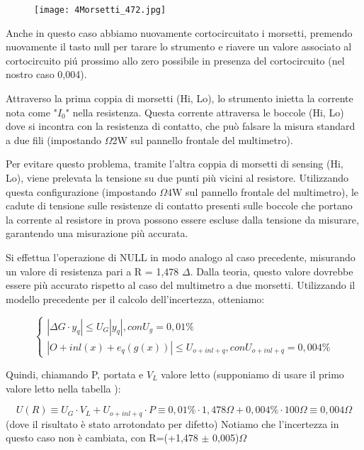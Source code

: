 \begin{figure}
    \centering
    \texttt{[image: 4Morsetti\_472.jpg]}
    \label{fig:4morsetti}
\end{figure}
Anche in questo caso abbiamo nuovamente cortocircuitato i morsetti, premendo nuovamente il tasto null per tarare lo strumento e riavere un valore associato al cortocircuito pi\'u prossimo allo zero possibile in presenza del cortocircuito (nel nostro caso 0,004).


Attraverso la prima coppia di morsetti (Hi, Lo), lo strumento inietta la corrente nota come "$I_0$" nella resistenza. Questa corrente attraversa le boccole (Hi, Lo) dove si incontra con la resistenza di contatto, che può falsare la misura standard a due fili (impostando $\Omega$2W sul pannello frontale del multimetro).

Per evitare questo problema, tramite l'altra coppia di morsetti di sensing (Hi, Lo), viene prelevata la tensione su due punti più vicini al resistore. Utilizzando questa configurazione (impostando $\Omega$4W sul pannello frontale del multimetro), le cadute di tensione sulle resistenze di contatto presenti sulle boccole che portano la corrente al resistore in prova possono essere escluse dalla tensione da misurare, garantendo una misurazione più accurata.

Si effettua l'operazione di NULL in modo analogo al caso precedente, misurando un valore di resistenza pari a R = 1,478 $\Delta$. Dalla teoria, questo valore dovrebbe essere più accurato rispetto al caso del multimetro a due morsetti. Utilizzando il modello precedente per il calcolo dell'incertezza, otteniamo:

\begin{equation}
    \left\{\begin{array}{l}
| \Delta G \cdot y_q | \leq U_G |y_q|,    con U_g=0,01\%
\\ | O + inl(x) + e_q(g(x)) | \leq U_{o+inl+q}, con U_{o+inl+q}=0,004\%
\end{array}\right.
\end{equation}


    


Quindi, chiamando P, portata e $V_L$ valore letto (supponiamo di usare il primo valore letto nella tabella \label{mult_port}):

\begin{equation*}
    U(R) \equiv U_G \cdot V_L + U_{o+inl+q} \cdot P \equiv 0,01\% \cdot 1,478\Omega + 0,004 \% \cdot 100 \Omega \equiv 0,004 \Omega 
\end{equation*}
(dove il risultato è stato arrotondato per difetto)
Notiamo che l’incertezza in questo caso non è cambiata, con R=(+1,478 $\pm$ 0,005)$\Omega$



